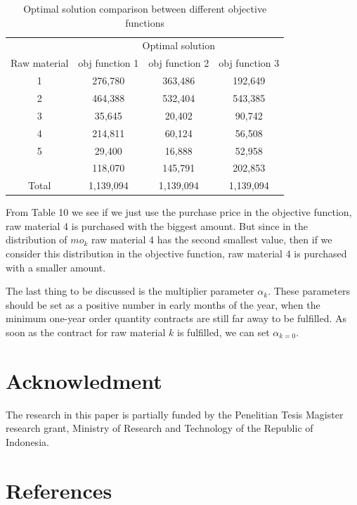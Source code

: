 \documentclass[preprint, 3p,
authoryear]{elsarticle} %
\begin{document}
\begin{table}[!h]

\caption{\label{tab:unnamed-chunk-13}Optimal solution comparison between different objective functions}
\centering
\begin{tabular}[t]{cccc}
\toprule
\multicolumn{1}{c}{ } & \multicolumn{3}{c}{Optimal solution} \\
\cmidrule(l{3pt}r{3pt}){2-4}
Raw material & obj function 1 & obj function 2 & obj function 3\\
\midrule
1 & 276,780 & 363,486 & 192,649\\
2 & 464,388 & 532,404 & 543,385\\
3 & 35,645 & 20,402 & 90,742\\
4 & 214,811 & 60,124 & 56,508\\
5 & 29,400 & 16,888 & 52,958\\
\addlinespace
6 & 118,070 & 145,791 & 202,853\\
Total & 1,139,094 & 1,139,094 & 1,139,094\\
\bottomrule
\end{tabular}
\end{table}

From Table 10 we see if we just use the purchase price in the objective
function, raw material 4 is purchased with the biggest amount. But since
in the distribution of \(mo_k\) raw material 4 has the second smallest
value, then if we consider this distribution in the objective function,
raw material 4 is purchased with a smaller amount.

The last thing to be discussed is the multiplier parameter \(\alpha_k\).
These parameters should be set as a positive number in early months of
the year, when the minimum one-year order quantity contracts are still
far away to be fulfilled. As soon as the contract for raw material \(k\)
is fulfilled, we can set \(\alpha_{k=0}\).

\hypertarget{acknowledment}{%
\section{Acknowledment}\label{acknowledment}}

The research in this paper is partially funded by the Penelitian Tesis
Magister research grant, Ministry of Research and Technology of the
Republic of Indonesia.

\hypertarget{references}{%
\section*{References}\label{references}}
\end{document}
